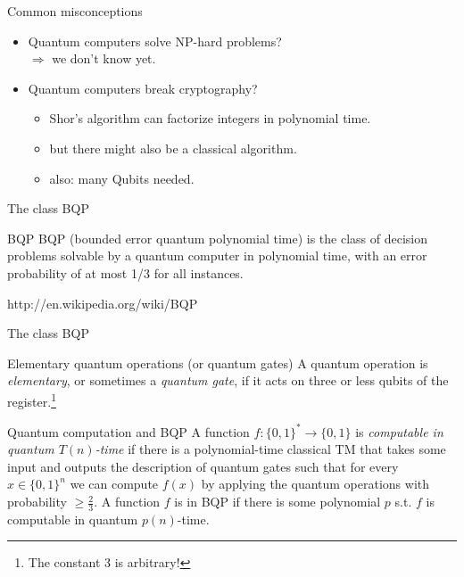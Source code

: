 \documentclass[c]{beamer}
\begin{document}

\begin{frame}{Common misconceptions}
\begin{itemize}
\item Quantum computers solve NP-hard problems? \\
$\Rightarrow$ we don't know yet.
\item Quantum computers break cryptography? \\
\begin{itemize}
\item Shor's algorithm can factorize integers in polynomial time.
\item but there might also be a classical algorithm.
\item also: many Qubits needed.
\end{itemize}
\end{itemize}
\end{frame}

\begin{frame}{The class BQP}
	\begin{block}{BQP}
		BQP (bounded error quantum polynomial time) is the class of decision problems solvable by a quantum computer in polynomial time, with an error probability of at most 1/3 for all instances.
	\end{block}
	http://en.wikipedia.org/wiki/BQP
\end{frame}

\begin{frame}{The class BQP}
	\begin{block}{Elementary quantum operations (or quantum gates)}
		A quantum operation is \emph{elementary}, or sometimes a \emph{quantum gate}, if it acts on three or less qubits of the register.\footnote{The constant 3 is arbitrary!}
	\end{block}
	
	\begin{block}{Quantum computation and BQP}
		A function $f:\{0,1\}^{*} \rightarrow \{0,1\}$ is \emph{computable in quantum $T(n)$-time} if there is a polynomial-time classical TM that takes some input and outputs the description of quantum gates such that for every $x \in \{0,1\}^{n}$ we can compute $f(x)$ by applying the quantum operations with probability $\ge \frac{2}{3}$. A function $f$ is in BQP if there is some polynomial $p$ s.t. $f$ is computable in quantum $p(n)$-time.
	\end{block}
\end{frame}
\end{document}
